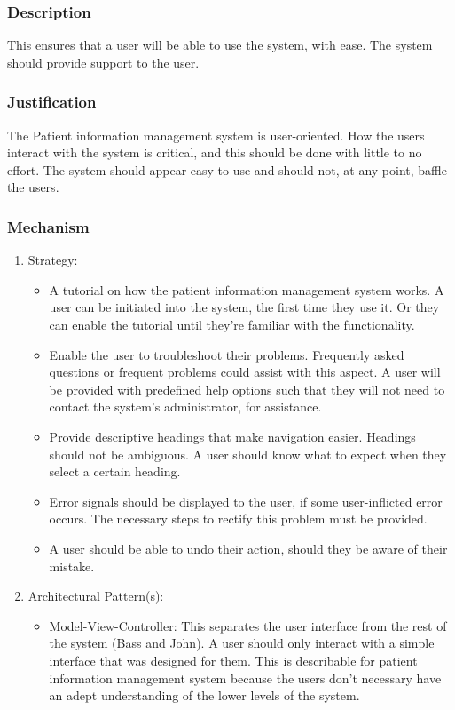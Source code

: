 \subsubsection*{Description}
This ensures that a user will be able to use the system, with ease. The system should provide support to the user.
\subsubsection*{Justification}
The Patient information management system is user-oriented. How the users interact with the system is critical, and this should be done with little to no effort. The system should appear easy to use and should not, at any point, baffle the users. 
\subsubsection*{Mechanism}
	\begin{enumerate}
		\item Strategy:
		
		 \begin{itemize}
		 	\item A tutorial on how the patient information management system works. A user can be initiated into the system, the first time they use it. Or they can enable the tutorial until they're familiar with the functionality.
		 	\item Enable the user to troubleshoot their problems. Frequently asked questions or frequent problems could assist with this aspect.  A user will be provided with predefined help options such that they will not need to contact the system's administrator, for assistance.
		 	\item Provide descriptive headings that make navigation easier. Headings should not be ambiguous. A user should know what to expect when they select a certain heading.
		 	\item Error signals should be displayed to the user, if some user-inflicted error occurs. The necessary steps to rectify this problem must be provided.
		 	\item A user should be able to undo their action, should they be aware of their mistake.
		 \end{itemize}
		 	
		\item Architectural Pattern(s):
		
		\begin{itemize}
			\item Model-View-Controller: This separates the user interface from the rest of the system (Bass and John). A user should only interact with a simple interface that was designed for them. This is describable for patient information management system because the users don't necessary have an adept understanding of the lower   levels of the system.
		\end{itemize}
	\end{enumerate}